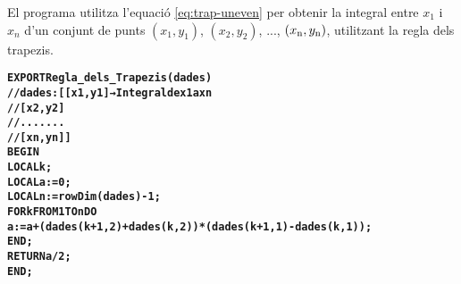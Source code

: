 El programa  utilitza l'equació  \eqref{eq:trap-uneven} per obtenir la integral entre $x_1$ i $x_n$ d'un conjunt  de punts $(x_1,y_1)$, $(x_2,y_2)$, ..., $(x_\mathrm{n},y_\mathrm{n})$, utilitzant la regla dels trapezis.
\vspace{-1cm}
\begin{alltt}
\bfseries
{}
    EXPORT Regla_dels_Trapezis(dades)
    // dades:[[x1,y1] → Integral de x1 a xn
    //        [x2,y2]
    //        .......
    //        [xn,yn]]
    BEGIN
      LOCAL k;
      LOCAL a:=0;
      LOCAL n:=rowDim(dades)-1;
      FOR k FROM 1 TO n DO
        a:=a+(dades(k+1,2)+dades(k,2))*(dades(k+1,1)-dades(k,1));
      END;
      RETURN a/2;
    END;
\end{alltt}




